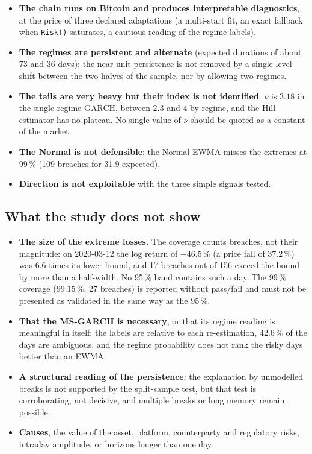 \documentclass[12pt,a4paper]{article}
\begin{document}
\begin{itemize}
	\item \textbf{The chain runs on Bitcoin and produces interpretable diagnostics}, at the price of three declared adaptations (a multi-start fit, an exact fallback when \texttt{Risk()} saturates, a cautious reading of the regime labels).
	\item \textbf{The regimes are persistent and alternate} (expected durations of about 73 and 36 days); the near-unit persistence is not removed by a single level shift between the two halves of the sample, nor by allowing two regimes.
	\item \textbf{The tails are very heavy but their index is not identified}: $\nu$ is $3.18$ in the single-regime GARCH, between $2.3$ and $4$ by regime, and the Hill estimator has no plateau. No single value of $\nu$ should be quoted as a constant of the market.
	\item \textbf{The Normal is not defensible}: the Normal EWMA misses the extremes at 99\,\% (109 breaches for 31.9 expected).
	\item \textbf{Direction is not exploitable} with the three simple signals tested.
\end{itemize}

\subsection{What the study does not show}

\begin{itemize}
	\item \textbf{The size of the extreme losses.} The coverage counts breaches, not their magnitude: on 2020-03-12 the log return of $-46.5\,\%$ (a price fall of $37.2\,\%$) was $6.6$ times its lower bound, and 17 breaches out of 156 exceed the bound by more than a half-width. No 95\,\% band contains such a day. The 99\,\% coverage ($99.15\,\%$, 27 breaches) is reported without pass/fail and must not be presented as validated in the same way as the 95\,\%.
	\item \textbf{That the MS-GARCH is necessary}, or that its regime reading is meaningful in itself: the labels are relative to each re-estimation, 42.6\,\% of the days are ambiguous, and the regime probability does not rank the risky days better than an EWMA.
	\item \textbf{A structural reading of the persistence}: the explanation by unmodelled breaks is not supported by the split-sample test, but that test is corroborating, not decisive, and multiple breaks or long memory remain possible.
	\item \textbf{Causes}, the value of the asset, platform, counterparty and regulatory risks, intraday amplitude, or horizons longer than one day.
\end{itemize}
\end{document}
